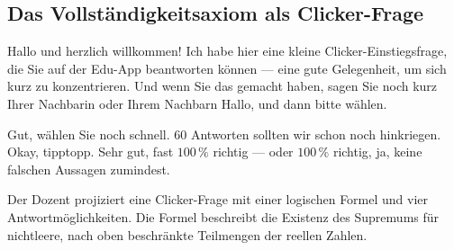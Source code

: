 \subsection{Das Vollständigkeitsaxiom als Clicker-Frage}
\begin{spoken-clean}[00:00:00 - 00:01:45]
Hallo und herzlich willkommen! Ich habe hier eine kleine Clicker-Einstiegsfrage, die Sie auf der Edu-App beantworten können --- eine gute Gelegenheit, um sich kurz zu konzentrieren. Und wenn Sie das gemacht haben, sagen Sie noch kurz Ihrer Nachbarin oder Ihrem Nachbarn Hallo, und dann bitte wählen.

Gut, wählen Sie noch schnell. $60$ Antworten sollten wir schon noch hinkriegen. Okay, tipptopp. Sehr gut, fast $100\,\%$ richtig --- oder $100\,\%$ richtig, ja, keine falschen Aussagen zumindest.
\end{spoken-clean}

\begin{meta-note}
Der Dozent projiziert eine Clicker-Frage mit einer logischen Formel und vier Antwortmöglichkeiten. Die Formel beschreibt die Existenz des Supremums für nichtleere, nach oben beschränkte Teilmengen der reellen Zahlen.
\end{meta-note}

